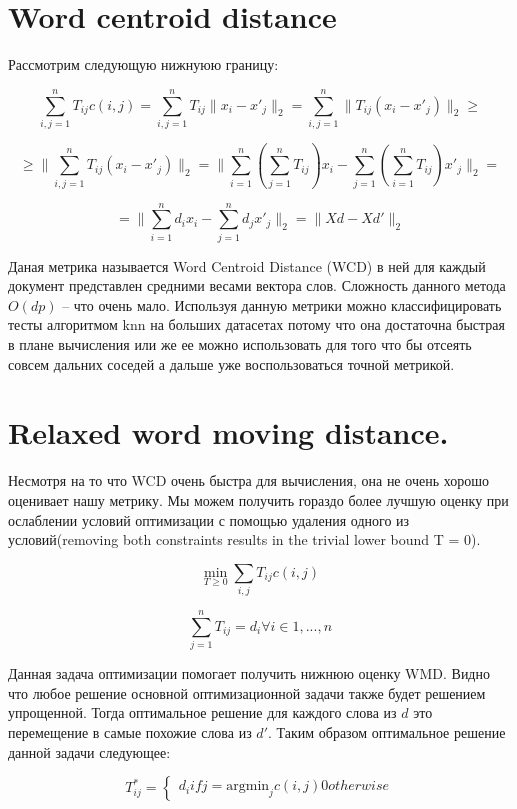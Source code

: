 \documentclass[10pt,reqno]{amsart}
\theoremstyle{definition}
\theoremstyle{remark}
\begin{document}
\section{Word centroid distance}

Рассмотрим следующую нижнуюю границу:

$$
\sum_{i,j=1}^n T_{ij} c(i,j) = \sum_{i,j=1}^n T_{ij} \|x_i - x'_j \|_2 = \sum_{i,j=1}^n \|T_{ij} (x_i - x'_j) \|_2 \geq
$$

$$
\geq \| \sum_{i,j=1}^n T_{ij} (x_i - x'_j) \|_2 = \| \sum_{i=1}^n \left(\sum_{j=1}^n T_{ij}\right) x_i - \sum_{j=1}^n \left(\sum_{i=1}^n T_{ij}\right) x'_j \|_2 =
$$

$$
= \| \sum_{i=1}^n d_i  x_i - \sum_{j=1}^n d_j x'_j \|_2 = \| Xd - Xd'\|_2
$$

Даная метрика называется Word Centroid Distance (WCD) в ней для каждый документ представлен средними весами вектора слов. Сложность данного метода $O(dp)$ -- что очень мало. Используя данную метрики можно классифицировать тесты алгоритмом knn на больших датасетах потому что она достаточна быстрая в плане вычисления или же ее можно использовать для того что бы отсеять совсем дальних соседей а дальше уже воспользоваться точной метрикой.

\section{Relaxed word moving distance.}

Несмотря на то что WCD очень быстра для вычисления, она не очень хорошо оценивает нашу метрику. Мы можем получить гораздо более лучшую оценку при ослаблении условий оптимизации с помощью удаления одного из условий(removing both constraints results in the trivial lower bound T = 0).

$$
\min_{T \geq 0} \sum_{i,j} T_{ij} c(i,j)
$$

$$
\sum_{j = 1}^n T_{ij} = d_i \forall i \in {1, ..., n}
$$

Данная задача оптимизации помогает получить нижнюю оценку WMD. Видно что любое  решение основной оптимизационной задачи также будет решением упрощенной. Тогда оптимальное решение для каждого слова из $d$ это перемещение в самые похожие слова из $d'$. Таким образом оптимальное решение данной задачи следующее:

$$
T^*_{ij} =
\begin{cases}
	d_i if j = \text{argmin}_j c(i,j)
	0 otherwise
\end{cases}
$$
\end{document}
